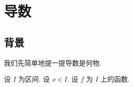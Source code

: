\chapter{导数}

\section{背景}

我们先简单地提一提导数是何物.

\begin{definition}
    设 $I$ 为区间. 设 $x \in I$. 设 $f$ 为 $I$ 上的函数.
\end{definition}
